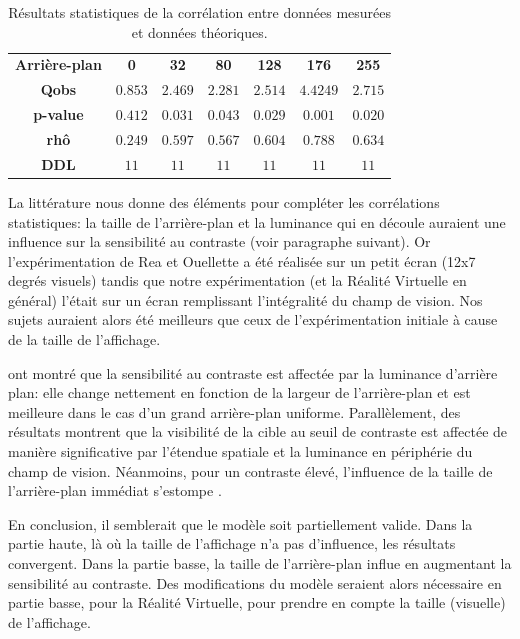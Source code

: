 	\begin{table}[h]	
		\centering
		\caption{Résultats statistiques de la corrélation entre données mesurées et données théoriques.}
		\label{tab:rvp_pearson_correlation}
		\begin{tabular}{ccccccc}
			\textbf{Arrière-plan} & \textbf{0} & \textbf{32} & \textbf{80} & \textbf{128} & \textbf{176} & \textbf{255}\\
			\textbf{Qobs} & $0.853$ & $2.469$ & $2.281$ & $2.514$ & $4.4249$ & $2.715$\\
			\textbf{p-value} & $0.412$ & $0.031$ & $0.043$ & $0.029$ & $0.001$ & $0.020$\\
			\textbf{rhô} & $0.249$ & $0.597$ & $0.567$ & $0.604$ & $0.788$ & $0.634$\\
			\textbf{DDL} & $11$ & $11$ & $11$ & $11$ & $11$ & $11$\\
		\end{tabular}
	\end{table}
	
	\par La littérature nous donne des éléments pour compléter les corrélations statistiques: la taille de l'arrière-plan et la luminance qui en découle auraient une influence sur la sensibilité au contraste (voir paragraphe suivant). Or l'expérimentation de Rea et Ouellette a été réalisée sur un petit écran (12x7 degrés visuels) tandis que notre expérimentation (et la Réalité Virtuelle en général) l'était sur un écran remplissant l'intégralité du champ de vision. Nos sujets auraient alors été meilleurs que ceux de l'expérimentation initiale à cause de la taille de l'affichage.
	
	\par \cite{mccann_effects_1980} ont montré que la sensibilité au contraste est affectée par la luminance d'arrière plan: elle change nettement en fonction de la largeur de l'arrière-plan et est meilleure dans le cas d'un grand arrière-plan uniforme. Parallèlement, des résultats montrent que la visibilité de la cible au seuil de contraste est affectée de manière significative par l'étendue spatiale et la luminance en périphérie du champ de vision. Néanmoins, pour un contraste élevé, l'influence de la taille de l'arrière-plan immédiat s'estompe \citep{nakamura_effect_2003}.
	
	\par En conclusion, il semblerait que le modèle soit partiellement valide. Dans la partie haute, là où la taille de l'affichage n'a pas d'influence, les résultats convergent. Dans la partie basse, la taille de l'arrière-plan influe en augmentant la sensibilité au contraste. Des modifications du modèle seraient alors nécessaire en partie basse, pour la Réalité Virtuelle, pour prendre en compte la taille (visuelle) de l'affichage.
